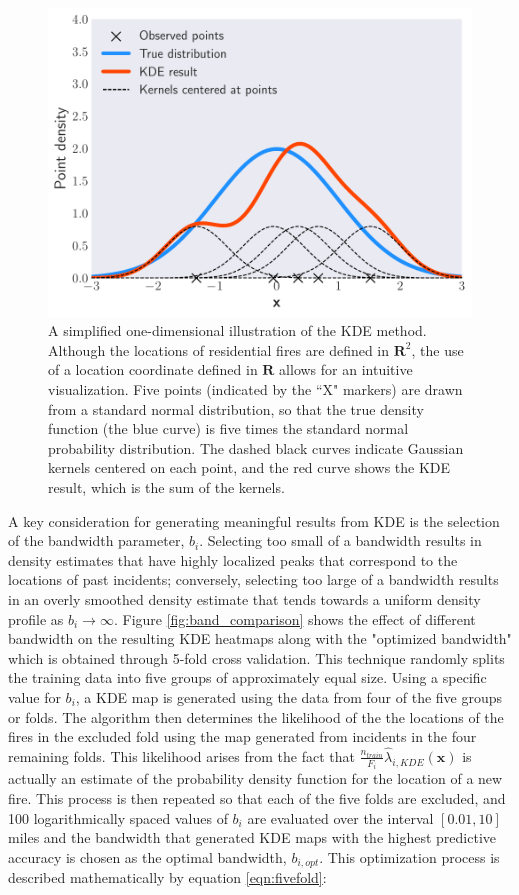 \documentclass{svjour3}
\begin{document}
\begin{figure}[htb] \centering
\includegraphics[width=.75\textwidth]{./figures/1dkde.pdf}
\caption{A simplified one-dimensional illustration of the KDE method. Although the locations of residential fires are defined in $\textbf{R}^2$, the use of a location coordinate defined in $\textbf{R}$ allows for an intuitive visualization. Five points (indicated by the ``X" markers) are drawn from a standard normal distribution, so that the true density function (the blue curve) is five times the standard normal probability distribution. The dashed black curves indicate Gaussian kernels centered on each point, and the red curve shows the KDE result, which is the sum of the kernels.}
\label{fig:1dkde}
\end{figure}

A key consideration for generating meaningful results from KDE is the selection of the bandwidth parameter, $b_i$. Selecting too small of a bandwidth results in density estimates that have highly localized peaks that correspond to the locations of past incidents; conversely, selecting too large of a bandwidth results in an overly smoothed density estimate that tends towards a uniform density profile as $b_i \rightarrow  \infty$. Figure \ref{fig:band_comparison} shows the effect of different bandwidth on the resulting KDE heatmaps along with the "optimized bandwidth" which is obtained through 5-fold cross validation. This technique randomly splits the training data into five groups of approximately equal size. Using a specific value for $b_i$, a KDE map is generated using the data from four of the five groups or folds. The algorithm then determines the likelihood of the the locations of the fires in the excluded fold using the map generated from incidents in the four remaining folds. This likelihood arises from the fact that $\frac{n_{train}}{F_i}\hat\lambda_{i,KDE}(\textbf{x})$ is actually an estimate of the probability density function for the location of a new fire. This process is then repeated so that each of the five folds are excluded, and 100 logarithmically spaced values of $b_i$ are evaluated over the interval $[0.01,10]$ miles and the bandwidth that generated KDE maps with the highest predictive accuracy is chosen as the optimal bandwidth, $b_{i,opt}$. This optimization process is described mathematically by equation \ref{eqn:fivefold}:
\end{document}
